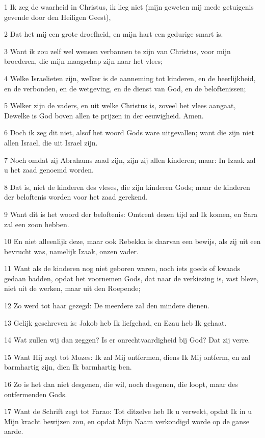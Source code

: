 \par 1 Ik zeg de waarheid in Christus, ik lieg niet (mijn geweten mij mede getuigenis gevende door den Heiligen Geest),
\par 2 Dat het mij een grote droefheid, en mijn hart een gedurige smart is.
\par 3 Want ik zou zelf wel wensen verbannen te zijn van Christus, voor mijn broederen, die mijn maagschap zijn naar het vlees;
\par 4 Welke Israelieten zijn, welker is de aanneming tot kinderen, en de heerlijkheid, en de verbonden, en de wetgeving, en de dienst van God, en de beloftenissen;
\par 5 Welker zijn de vaders, en uit welke Christus is, zoveel het vlees aangaat, Dewelke is God boven allen te prijzen in der eeuwigheid. Amen.
\par 6 Doch ik zeg dit niet, alsof het woord Gods ware uitgevallen; want die zijn niet allen Israel, die uit Israel zijn.
\par 7 Noch omdat zij Abrahams zaad zijn, zijn zij allen kinderen; maar: In Izaak zal u het zaad genoemd worden.
\par 8 Dat is, niet de kinderen des vleses, die zijn kinderen Gods; maar de kinderen der beloftenis worden voor het zaad gerekend.
\par 9 Want dit is het woord der beloftenis: Omtrent dezen tijd zal Ik komen, en Sara zal een zoon hebben.
\par 10 En niet alleenlijk deze, maar ook Rebekka is daarvan een bewijs, als zij uit een bevrucht was, namelijk Izaak, onzen vader.
\par 11 Want als de kinderen nog niet geboren waren, noch iets goeds of kwaads gedaan hadden, opdat het voornemen Gods, dat naar de verkiezing is, vast bleve, niet uit de werken, maar uit den Roepende;
\par 12 Zo werd tot haar gezegd: De meerdere zal den mindere dienen.
\par 13 Gelijk geschreven is: Jakob heb Ik liefgehad, en Ezau heb Ik gehaat.
\par 14 Wat zullen wij dan zeggen? Is er onrechtvaardigheid bij God? Dat zij verre.
\par 15 Want Hij zegt tot Mozes: Ik zal Mij ontfermen, diens Ik Mij ontferm, en zal barmhartig zijn, dien Ik barmhartig ben.
\par 16 Zo is het dan niet desgenen, die wil, noch desgenen, die loopt, maar des ontfermenden Gods.
\par 17 Want de Schrift zegt tot Farao: Tot ditzelve heb Ik u verwekt, opdat Ik in u Mijn kracht bewijzen zou, en opdat Mijn Naam verkondigd worde op de ganse aarde.

